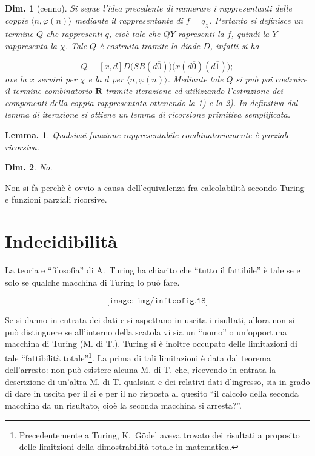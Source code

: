 \documentclass{book}
\newtheorem{lemma}{Lemma.}[chapter]
\newtheorem{dimostrazione}{Dim.}[chapter]
\begin{document}
\begin{dimostrazione}[cenno]
Si segue l'idea precedente di numerare i rappresentanti delle coppie $\langle n
, \varphi(n) \rangle$ mediante il rappresentante di $f = q_{\chi}$.
Pertanto si definisce un termine $Q$ che rappresenti $q$, cio\`e tale che $QY$
rapresenti la $f$, quindi la $Y$ rappresenta la $\chi$. Tale $Q$ \`e costruita
tramite la diade $D$, infatti si ha 

\[Q \equiv [x, d]D\bigl(SB(d\overline{0})\bigr)
\bigl(x(d\overline{0})(d\overline{1})\bigr);\]
 ove la $x$ servir\`a per $\chi$ e la $d$ per
$\langle n, \varphi(n) \rangle$. Mediante tale $Q$ si pu\`o poi costruire il 
termine combinatorio $\mathbf{R}$ tramite iterazione ed utilizzando 
l'estrazione dei componenti della coppia rappresentata ottenendo la 1) e la 2).
In definitiva dal lemma di iterazione si ottiene un lemma di ricorsione 
primitiva semplificata.
\end{dimostrazione}

\begin{lemma}
Qualsiasi funzione rappresentabile combinatoriamente \`e parziale ricorsiva.
\end{lemma}

\begin{dimostrazione}
No.
\end{dimostrazione}
Non si fa perch\`e \`e ovvio a causa dell'equivalenza fra calcolabilit\`a
secondo Turing e funzioni parziali ricorsive.

\chapter{Indecidibilit\`a}
La teoria e ``filosofia'' di A.~Turing ha chiarito che ``tutto il fattibile'' 
\`e tale se e solo se qualche macchina di Turing lo pu\`o fare.

\[
\texttt{[image: img/infteofig.18]}
\]

Se si danno in entrata dei dati e si aspettano in uscita i risultati, allora
non si pu\`o distinguere se all'interno della scatola vi sia un ``uomo'' o
un'opportuna macchina di Turing (M. di T.).
Turing si \`e inoltre occupato delle limitazioni di tale ``fattibilit\`a 
totale''\footnote{Precedentemente a Turing, K.~G\"odel aveva trovato dei 
risultati a proposito delle limitzioni della dimostrabilit\`a totale in 
matematica.}.
La prima di tali limitazioni \`e data dal teorema dell'arresto: non pu\`o
esistere alcuna M. di T. che, ricevendo in entrata la descrizione di un'altra
M. di T. qualsiasi e dei relativi dati d'ingresso, sia in grado di dare in 
uscita per il si e per il no risposta al quesito ``il calcolo della seconda
macchina da un risultato, cio\`e la seconda macchina si arresta?''.
\end{document}
